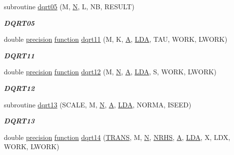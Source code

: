 \begin{DoxyCompactItemize}
subroutine \hyperlink{group__double__lin_ga05f7e3ae4a13016feb188b80d64b9549}{dqrt05} (M, \hyperlink{polmisc_8c_a0240ac851181b84ac374872dc5434ee4}{N}, L, N\+B, R\+E\+S\+U\+L\+T)
\begin{DoxyCompactList}\small\item\em {\bfseries D\+Q\+R\+T05} \end{DoxyCompactList}\item 
double \hyperlink{numinquire_8h_a2c8e616467665d0b2814d4c1589ba74e}{precision} \hyperlink{afunc_8m_a7b5e596df91eadea6c537c0825e894a7}{function} \hyperlink{group__double__lin_ga98a4d19fa7bda31febc31ef36e98a201}{dqrt11} (M, K, \hyperlink{classA}{A}, \hyperlink{example__user_8c_ae946da542ce0db94dced19b2ecefd1aa}{L\+D\+A}, T\+A\+U, W\+O\+R\+K, L\+W\+O\+R\+K)
\begin{DoxyCompactList}\small\item\em {\bfseries D\+Q\+R\+T11} \end{DoxyCompactList}\item 
double \hyperlink{numinquire_8h_a2c8e616467665d0b2814d4c1589ba74e}{precision} \hyperlink{afunc_8m_a7b5e596df91eadea6c537c0825e894a7}{function} \hyperlink{group__double__lin_ga7d13af7cb195c3ae7f3d8a5b426d3b43}{dqrt12} (M, \hyperlink{polmisc_8c_a0240ac851181b84ac374872dc5434ee4}{N}, \hyperlink{classA}{A}, \hyperlink{example__user_8c_ae946da542ce0db94dced19b2ecefd1aa}{L\+D\+A}, S, W\+O\+R\+K, L\+W\+O\+R\+K)
\begin{DoxyCompactList}\small\item\em {\bfseries D\+Q\+R\+T12} \end{DoxyCompactList}\item 
subroutine \hyperlink{group__double__lin_ga5e9d0310254a3d894adcb0a294e35929}{dqrt13} (S\+C\+A\+L\+E, M, \hyperlink{polmisc_8c_a0240ac851181b84ac374872dc5434ee4}{N}, \hyperlink{classA}{A}, \hyperlink{example__user_8c_ae946da542ce0db94dced19b2ecefd1aa}{L\+D\+A}, N\+O\+R\+M\+A, I\+S\+E\+E\+D)
\begin{DoxyCompactList}\small\item\em {\bfseries D\+Q\+R\+T13} \end{DoxyCompactList}\item 
double \hyperlink{numinquire_8h_a2c8e616467665d0b2814d4c1589ba74e}{precision} \hyperlink{afunc_8m_a7b5e596df91eadea6c537c0825e894a7}{function} \hyperlink{group__double__lin_gadfa4e22bf094c33371f7be71f68c0a9b}{dqrt14} (\hyperlink{superlu__enum__consts_8h_a0c4e17b2d5cea33f9991ccc6a6678d62a1f61e3015bfe0f0c2c3fda4c5a0cdf58}{T\+R\+A\+N\+S}, M, \hyperlink{polmisc_8c_a0240ac851181b84ac374872dc5434ee4}{N}, \hyperlink{example__user_8c_aa0138da002ce2a90360df2f521eb3198}{N\+R\+H\+S}, \hyperlink{classA}{A}, \hyperlink{example__user_8c_ae946da542ce0db94dced19b2ecefd1aa}{L\+D\+A}, X, L\+D\+X, W\+O\+R\+K, L\+W\+O\+R\+K)

\end{DoxyCompactItemize}
